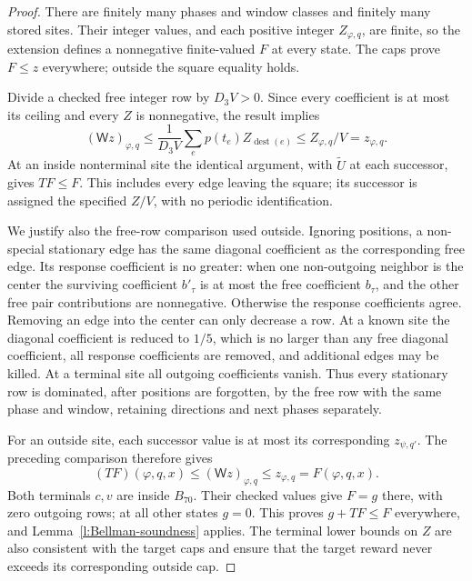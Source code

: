 \begin{proof}
There are finitely many phases and window classes and finitely many
stored sites. Their integer values, and each positive integer
\(Z_{\varphi,q}\), are finite, so the extension defines a
nonnegative finite-valued \(F\) at every state. The caps prove
\(F\le z\) everywhere; outside the square equality holds.

Divide a checked free integer row by \(D_3V>0\). Since every
coefficient is at most its ceiling and every \(Z\) is nonnegative,
the result implies
\[
 (\mathsf Wz)_{\varphi,q}
 \le\frac1{D_3V}\sum_{e}p(t_e)Z_{\operatorname{dest}(e)}
 \le Z_{\varphi,q}/V=z_{\varphi,q}.
\]
At an inside nonterminal site the identical argument, with
\(\widetilde U\) at each successor, gives \(TF\le F\).
This includes every edge leaving the square; its successor is
assigned the specified \(Z/V\), with no periodic identification.

We justify also the free-row comparison used outside. Ignoring
positions, a non-special stationary edge has the same diagonal
coefficient as the corresponding free edge. Its response coefficient
is no greater: when one non-outgoing neighbor is the center the
surviving coefficient \(b'_\tau\) is at most the free coefficient
\(b_\tau\), and the other free pair contributions are nonnegative.
Otherwise the response coefficients agree. Removing an edge into
the center can only decrease a row. At a known site the diagonal
coefficient is reduced to \(1/5\), which is no larger than any
free diagonal coefficient, all response coefficients are removed,
and additional edges may be killed. At a terminal site all outgoing
coefficients vanish. Thus every stationary row is dominated, after
positions are forgotten, by the free row with the same phase and
window, retaining directions and next phases separately.

For an outside site, each successor value is at most its
corresponding \(z_{\psi,q'}\). The preceding comparison therefore
gives
\[
 (TF)(\varphi,q,x)\le(\mathsf Wz)_{\varphi,q}
                       \le z_{\varphi,q}=F(\varphi,q,x).
\]
Both terminals \(c,v\) are inside \(B_{70}\). Their checked
values give \(F=g\) there, with zero outgoing rows; at all other
states \(g=0\). This proves \(g+TF\le F\) everywhere, and
Lemma~\ref{l:Bellman-soundness} applies. The terminal lower bounds
on \(Z\) are also consistent with the target caps and ensure that
the target reward never exceeds its corresponding outside cap.
\end{proof}

